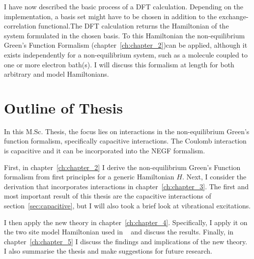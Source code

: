I have now described the basic process of a DFT calculation. Depending on the implementation, a basis set might have to be chosen in addition to the exchange\hyp{}correlation functional.The DFT calculation returns the Hamiltonian of the system formulated in the chosen basis. To this Hamiltonian the non-equilibrium Green's Function Formalism (chapter~\ref{ch:chapter_2})can be applied, although it exists independently for a non-equilibrium system, such as a molecule coupled to one or more electron bath(s). I will discuss this formalism at length for both arbitrary and model Hamiltonians.

\section{Outline of Thesis}
In this M.Sc. Thesis, the focus lies on interactions in the non-equilibrium Green's function formalism, specifically capacitive interactions. The Coulomb interaction is capacitive and it can be incorporated into the NEGF formalism.

First, in chapter~\ref{ch:chapter_2} I derive the non-equilibrium Green's Function formalism from first principles for a generic Hamiltonian $H$. Next, I consider the derivation that incorporates interactions in chapter~\ref{ch:chapter_3}. The first and most important result of this thesis are the capacitive interactions of section~\ref{sec:capacitive}, but I will also took a brief look at vibrational excitations.

I then apply the new theory  in chapter~\ref{ch:chapter_4}. Specifically, I apply it on the two site model Hamiltonian used in ~\citet{perrinnano} and discuss the results. Finally, in chapter~\ref{ch:chapter_5} I discuss the findings and implications of the new theory. I also summarise the thesis and make suggestions for future research.

\clearpage
{}